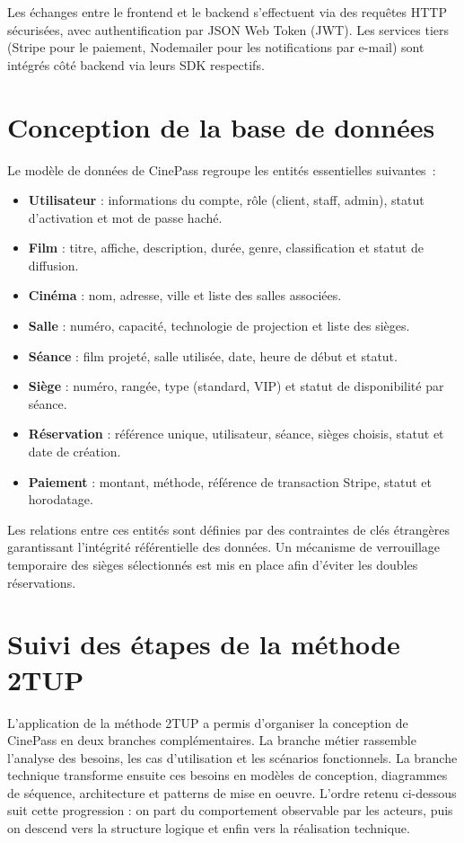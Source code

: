 \documentclass[12pt]{report}
\begin{document}
Les échanges entre le frontend et le backend s'effectuent via des requêtes HTTP
sécurisées, avec authentification par JSON Web Token (JWT). Les services tiers
(Stripe pour le paiement, Nodemailer pour les notifications par e-mail) sont intégrés
côté backend via leurs SDK respectifs.

\section{Conception de la base de données}

Le modèle de données de CinePass regroupe les entités essentielles suivantes~:

\begin{itemize}
    \item \textbf{Utilisateur} : informations du compte, rôle (client, staff, admin),
          statut d'activation et mot de passe haché.
    \item \textbf{Film} : titre, affiche, description, durée, genre, classification
          et statut de diffusion.
    \item \textbf{Cinéma} : nom, adresse, ville et liste des salles associées.
    \item \textbf{Salle} : numéro, capacité, technologie de projection et liste
          des sièges.
    \item \textbf{Séance} : film projeté, salle utilisée, date, heure de début
          et statut.
    \item \textbf{Siège} : numéro, rangée, type (standard, VIP) et statut de
          disponibilité par séance.
    \item \textbf{Réservation} : référence unique, utilisateur, séance, sièges
          choisis, statut et date de création.
    \item \textbf{Paiement} : montant, méthode, référence de transaction Stripe,
          statut et horodatage.
\end{itemize}

Les relations entre ces entités sont définies par des contraintes de clés étrangères
garantissant l'intégrité référentielle des données. Un mécanisme de verrouillage
temporaire des sièges sélectionnés est mis en place afin d'éviter les doubles
réservations.

\section{Suivi des étapes de la méthode 2TUP}
L'application de la méthode 2TUP a permis d'organiser la conception de CinePass
en deux branches complémentaires. La branche métier rassemble l'analyse des besoins,
les cas d'utilisation et les scénarios fonctionnels. La branche technique transforme
ensuite ces besoins en modèles de conception, diagrammes de séquence, architecture
et patterns de mise en oeuvre. L'ordre retenu ci-dessous suit cette progression :
on part du comportement observable par les acteurs, puis on descend vers la
structure logique et enfin vers la réalisation technique.
\end{document}
